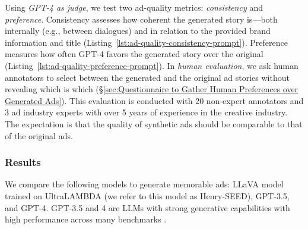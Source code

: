 Using \textit{GPT-4 as judge}, we test two ad-quality metrics: \textit{consistency} and \textit{preference}. 
Consistency assesses how coherent the generated story is—both internally (e.g., between dialogues) and in relation to the provided brand information and title (Listing~\ref{lst:ad-quality-consistency-prompt}). 
Preference measures how often GPT-4 favors the generated story over the original (Listing~\ref{lst:ad-quality-preference-prompt}). In \textit{human evaluation}, we ask human annotators to select between the generated and the original ad stories without revealing which is which (\S\ref{sec:Questionnaire to Gather Human Preferences over Generated Ads}). This evaluation is conducted with 20 non-expert annotators and 3 ad industry experts with over 5 years of experience in the creative industry. The expectation is that the quality of synthetic ads should be comparable to that of the original ads.













\subsubsection{Results}  
We compare the following models to generate memorable ads: LLaVA model trained on UltraLAMBDA (we refer to this model as Henry-SEED), GPT-3.5, and GPT-4. GPT-3.5 and 4 are LLMs with strong generative capabilities with high performance across many benchmarks \cite{brown2020language}. 


